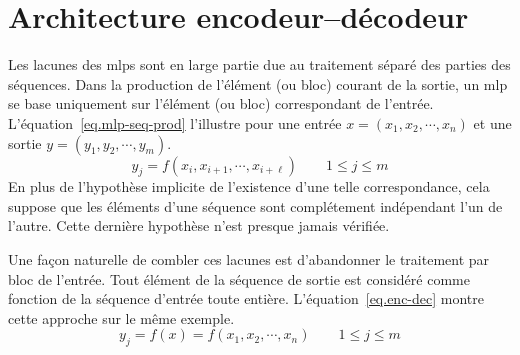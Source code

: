 \section{Architecture encodeur--décodeur}

Les lacunes des \glspl{mlp} sont en large partie due au traitement séparé des parties des séquences.
Dans la production de l'élément (ou bloc) courant de la sortie,
un \gls{mlp} se base uniquement sur l'élément (ou bloc) correspondant de l'entrée.
L'équation~\ref{eq.mlp-seq-prod} l'illustre pour une entrée \(x = (x_1, x_2, \cdots, x_n)\)
et une sortie \(y = (y_1, y_2, \cdots, y_m)\).
\begin{equation}
    \label{eq.mlp-seq-prod}
    y_j = f(x_i, x_{i+1}, \cdots, x_{i+\ell}) \qquad 1 \le j \le m
\end{equation}
En plus de l'hypothèse implicite de l'existence d'une telle correspondance,
cela suppose que les éléments d'une séquence sont complétement indépendant l'un de l'autre.
Cette dernière hypothèse n'est presque jamais vérifiée. 

Une façon naturelle de combler ces lacunes est d'abandonner le traitement par bloc de l'entrée.
Tout élément de la séquence de sortie est considéré comme fonction de la séquence d'entrée toute entière.
L'équation~\ref{eq.enc-dec} montre cette approche sur le même exemple.
\begin{equation}
    \label{eq.enc-dec}
    y_j = f(x) = f(x_1, x_2, \cdots, x_n) \qquad 1 \le j \le m
\end{equation}

